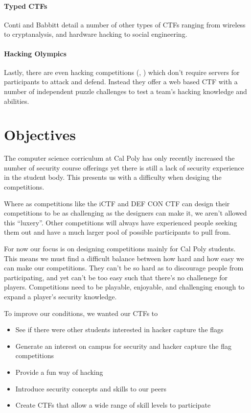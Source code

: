 \documentclass[10pt]{article}
\begin{document}
\paragraph*{Typed CTFs} Conti and Babbitt
\cite{HackingCompetitionsForSecurityEducation} detail a number of other types
of CTFs ranging from wireless to cryptanalysis, and hardware hacking to social
engineering.

\paragraph*{Hacking Olympics} \label{HackingOlympics} Lastly, there are even hacking 
competitions (\cite{Cipher}, \cite{SMPCTF}) which don't require servers for participants to
attack and defend. Instead they offer a web based CTF with a number of
independent puzzle challenges to test a team's hacking knowledge and abilities.

\section{Objectives}
The computer science corriculum at Cal Poly has only recently increased the
number of security course offerings yet there is still a lack of security
experience in the student body. This presents us with a difficulty when desiging
the competitions. 

Where as competitions like the iCTF and DEF CON CTF can design their
competitions to be as challenging as the designers can make it, we aren't
allowed this ``luxery''. Other competitions will always have experienced people
seeking them out and have a much larger pool of possible participants to pull
from.

For now our focus is on designing competitions mainly for Cal Poly students.
This means we must find a difficult balance between how hard and how easy we can
make our competitions. They can't be so hard as to discourage people from
participating, and yet can't be too easy such that there's no challenege for
players. Competitions need to be playable, enjoyable, and challenging enough to
expand a player's security knowledge.

To improve our conditions, we wanted our CTFs to

\begin{itemize}
    \item See if there were other students interested in hacker capture the flags
    \item Generate an interest on campus for security and hacker capture the 
      flag competitions
    \item Provide a fun way of hacking 
    \item Introduce security concepts and skills to our peers
    \item Create CTFs that allow a wide range of skill levels to participate
\end{itemize}
\end{document}
